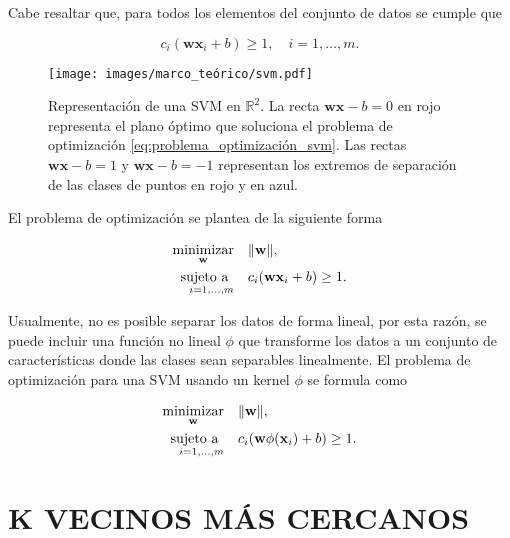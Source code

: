 Cabe resaltar que, para todos los elementos del conjunto de datos se cumple que

\begin{equation}
    c_i(\mathbf{w}\mathbf{x}_i + b) \geq 1, \quad i=1,\dots, m.
\end{equation}

\begin{figure}[H]
    \centering
    \caption{\hspace{2mm}Representación de una SVM en $\mathbb{R}^2$. La recta $\mathbf{wx} -b = 0$ en rojo representa el plano óptimo que soluciona el problema de optimización \eqref{eq:problema_optimización_svm}. Las rectas $\mathbf{wx} -b = 1$ y $\mathbf{wx} -b = -1$ representan los extremos de separación de las clases de puntos en rojo y en azul.}
    \texttt{[image: images/marco\_teórico/svm.pdf]}
    \label{fig:svm}
\end{figure}

El problema de optimización se plantea de la siguiente forma

\begin{equation}
    \begin{aligned}
        \operatorname*{minimizar}_{\mathbf{w}} & \quad \Vert \mathbf{w} \Vert, \\
        \operatorname*{sujeto \ a}_{\quad i=1,\dots, m} & \quad c_i(\mathbf{w}\mathbf{x}_i + b) \geq 1.
    \end{aligned}
    \label{eq:problema_optimización_svm}
\end{equation}

Usualmente, no es posible separar los datos de forma lineal, por esta razón, se puede incluir una función no lineal $ \phi$ que transforme los datos a un conjunto de características donde las clases sean separables linealmente. El problema de optimización para una SVM usando un kernel $\phi$ se formula como

\begin{equation}
    \begin{aligned}
        \operatorname*{minimizar}_{\mathbf{w}} & \quad \Vert \mathbf{w} \Vert, \\
        \operatorname*{sujeto \ a}_{\quad i=1,\dots, m} & \quad c_i(\mathbf{w}\phi(\mathbf{x}_i) + b) \geq 1.
    \end{aligned}
\end{equation}


\section{K VECINOS MÁS CERCANOS}

